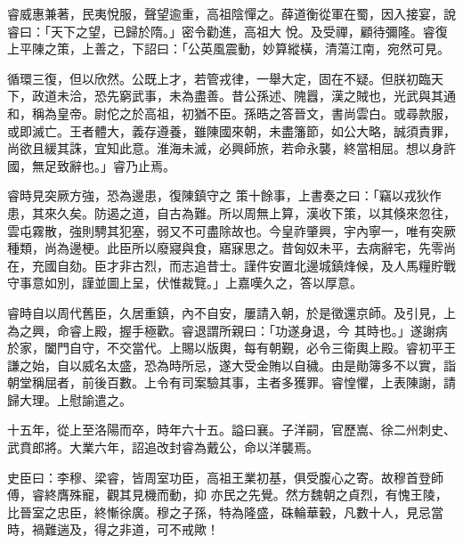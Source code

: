 \begin{pinyinscope}
 睿威惠兼著，民夷悅服，聲望逾重，高祖陰憚之。薛道衡從軍在蜀，因入接宴，說睿曰：「天下之望，已歸於隋。」密令勸進，高祖大
 悅。及受禪，顧待彌隆。睿復上平陳之策，上善之，下詔曰：「公英風震動，妙算縱橫，清蕩江南，宛然可見。



 循環三復，但以欣然。公既上才，若管戎律，一舉大定，固在不疑。但朕初臨天下，政道未洽，恐先窮武事，未為盡善。昔公孫述、隗囂，漢之賊也，光武與其通和，稱為皇帝。尉佗之於高祖，初猶不臣。孫晧之答晉文，書尚雲白。或尋款服，或即滅亡。王者體大，義存遵養，雖陳國來朝，未盡籓節，如公大略，誠須責罪，尚欲且緩其誅，宜知此意。淮海未滅，必興師旅，若命永襲，終當相屈。想以身許國，無足致辭也。」睿乃止焉。



 睿時見突厥方強，恐為邊患，復陳鎮守之
 策十餘事，上書奏之曰：「竊以戎狄作患，其來久矣。防遏之道，自古為難。所以周無上算，漢收下策，以其倏來忽往，雲屯霧散，強則騁其犯塞，弱又不可盡除故也。今皇祚肇興，宇內寧一，唯有突厥種類，尚為邊梗。此臣所以廢寢與食，寤寐思之。昔匈奴未平，去病辭宅，先零尚在，充國自劾。臣才非古烈，而志追昔士。謹件安置北邊城鎮烽候，及人馬糧貯戰守事意如別，謹並圖上呈，伏惟裁覽。」上嘉嘆久之，答以厚意。



 睿時自以周代舊臣，久居重鎮，內不自安，屢請入朝，於是徵還京師。及引見，上為之興，命睿上殿，握手極歡。睿退謂所親曰：「功遂身退，今
 其時也。」遂謝病於家，闔門自守，不交當代。上賜以版輿，每有朝覲，必令三衛輿上殿。睿初平王謙之始，自以威名太盛，恐為時所忌，遂大受金賄以自穢。由是勛簿多不以實，詣朝堂稱屈者，前後百數。上令有司案驗其事，主者多獲罪。睿惶懼，上表陳謝，請歸大理。上慰諭遣之。



 十五年，從上至洛陽而卒，時年六十五。謚曰襄。子洋嗣，官歷嵩、徐二州刺史、武賁郎將。大業六年，詔追改封睿為戴公，命以洋襲焉。



 史臣曰：李穆、梁睿，皆周室功臣，高祖王業初基，俱受腹心之寄。故穆首登師傅，睿終膺殊寵，觀其見機而動，抑
 亦民之先覺。然方魏朝之貞烈，有愧王陵，比晉室之忠臣，終慚徐廣。穆之子孫，特為隆盛，硃輪華轂，凡數十人，見忌當時，禍難遄及，得之非道，可不戒歟！



\end{pinyinscope}